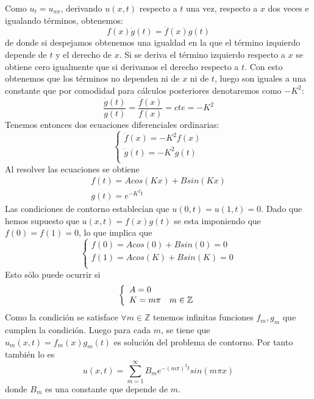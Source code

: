 Como $u_t = u_{xx}$, derivando $u(x,t)$ respecto a $t$ una vez, respecto a $x$ dos veces e igualando términos, obtenemos:
$$f(x) \dot{g}(t) = \ddot{f}(x) g(t)$$
de donde si despejamos obtenemos una igualdad en la que el término izquierdo depende de $t$ y el derecho de $x$. Si se deriva el término izquierdo respecto a $x$ se obtiene cero igualmente que si derivamos el derecho respecto a $t$. Con esto obtenemos que los términos no dependen ni de $x$ ni de $t$, luego son iguales a una constante que por comodidad para cálculos posteriores denotaremos como $-K^2$:
$$\frac{\dot{g}(t)}{g(t)} = \frac{\ddot{f}(x)}{f(x)} = cte = -K^2$$
Tenemos entonces dos ecuaciones diferenciales ordinarias:
\begin{equation*}
	\left\{
	\begin{array}{l}
		\ddot{f}(x) = -K^2 f(x)\\
		\dot{g}(t) = -K^2 g(t)\\
	\end{array}
	\right.
\end{equation*}
Al resolver las ecuaciones se obtiene
\begin{equation*}
	\begin{array}{l}
		f(t) = Acos(Kx) + Bsin(Kx)\\
		g(t) = e^{-K^2 t}
	\end{array}
\end{equation*}
Las condiciones de contorno establecían que $u(0,t) = u(1,t) = 0$. 
Dado que hemos supuesto que $u(x,t) = f(x)g(t)$ se esta imponiendo que $f(0) = f(1) = 0$, lo que implica que
\begin{equation*}
	\left\{
	\begin{array}{l}
		f(0) = Acos(0) + Bsin(0) = 0\\
		f(1) = Acos(K) + Bsin(K) = 0\\
	\end{array}
	\right.
\end{equation*}
Esto sólo puede ocurrir si
\begin{equation*}
	\left\{
	\begin{array}{l l}
		A = 0 & \\
		K = m\pi & m\in\mathbb{Z}\\
	\end{array}
	\right.
\end{equation*}
Como la condición se satisface $\forall m \in \mathbb{Z}$ tenemos infinitas funciones $f_m, g_m$ que cumplen la condición. Luego para cada $m$, se tiene que $u_m(x,t) = f_m(x)g_m(t)$ es solución del problema de contorno.
Por tanto también lo es
$$u(x,t) = \sum_{m=1}^\infty B_m e^{-(m\pi)^2 t} sin(m\pi x)$$
donde $B_m$ es una constante que depende de $m$.

